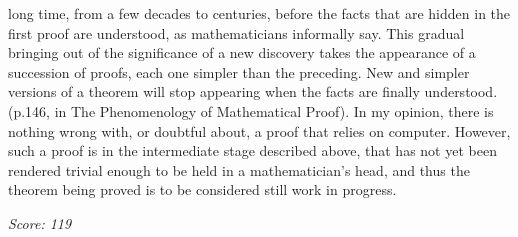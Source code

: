 \documentclass{article}
\begin{document}
long time, from a few decades to centuries, before the facts that are hidden in the first proof are understood, as mathematicians informally say. This gradual bringing out of the significance of a new discovery takes the appearance of a succession of proofs, each one simpler than the preceding. New and simpler versions of a theorem will stop appearing when the facts are finally understood. (p.146, in The Phenomenology of Mathematical Proof). In my opinion, there is nothing wrong with, or doubtful about, a proof that relies on computer. However, such a proof is in the intermediate stage described above, that has not yet been rendered trivial enough to be held in a mathematician's head, and thus the theorem being proved is to be considered still work in progress.

\vspace{1em}
\noindent\textit{Score: 119}
\end{document}
